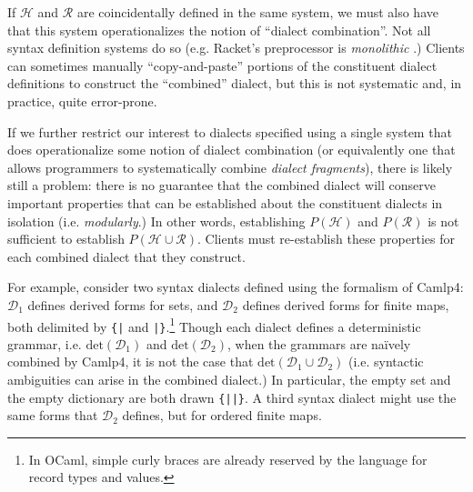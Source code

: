 If $\mathcal{H}$ and $\mathcal{R}$ are coincidentally defined in the same system, we must also have that this system operationalizes the notion of ``dialect combination''. Not all syntax definition systems do so (e.g. Racket's preprocessor is \emph{monolithic} \cite{Flatt:2012:CLR:2063176.2063195}.) Clients can sometimes manually  ``copy-and-paste'' portions of the constituent dialect definitions to construct the ``combined'' dialect, but this is not systematic and, in practice, quite error-prone.%

If we further restrict our interest  to dialects specified using a single system that does operationalize some notion of dialect combination (or equivalently one that allows programmers to systematically combine \emph{dialect fragments}), there is likely still a problem: there is no guarantee that the combined dialect will conserve important properties that can be established about the constituent dialects in isolation (i.e. \emph{modularly}.) In other words, establishing $P(\mathcal{H})$ and $P(\mathcal{R})$ is not sufficient to establish $P(\mathcal{H} \cup \mathcal{R})$. Clients must re-establish these properties for each combined dialect that they construct.%

For example, consider two syntax dialects defined using the formalism of Camlp4: $\mathcal{D}_1$ defines derived forms for sets, and $\mathcal{D}_2$ defines derived forms for finite maps, both delimited by \verb~{|~ and \verb~|}~.\footnote{In OCaml, simple curly braces are already reserved by the language for record types and values.} Though each dialect defines a deterministic grammar, i.e. $\mathrm{det}(\mathcal{D}_1)$ and $\mathrm{det}(\mathcal{D}_2)$, when the grammars are na\"ively combined by Camlp4, it is not the case that $\mathrm{det}(\mathcal{D}_1 \cup \mathcal{D}_2)$ (i.e. syntactic ambiguities can arise in the combined dialect.) In particular, the empty set and the empty dictionary are both drawn \verb~{||}~. A third syntax dialect might use the same forms that $\mathcal{D}_2$ defines, but for ordered finite maps.

